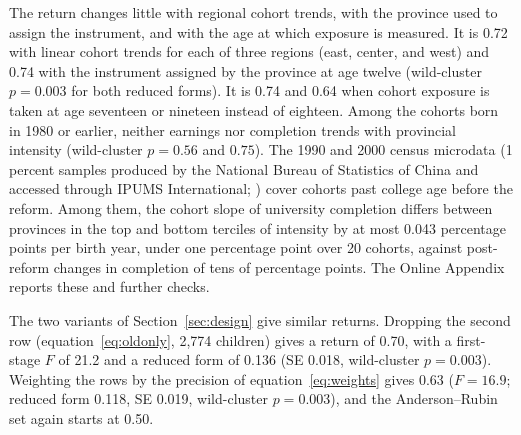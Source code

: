 \documentclass[11pt]{article}
\begin{document}
The return changes little with regional cohort trends, with the province used to assign the instrument, and with the age at which exposure is measured. It is 0.72 with linear cohort trends for each of three regions (east, center, and west) and 0.74 with the instrument assigned by the province at age twelve (wild-cluster $p = 0.003$ for both reduced forms). It is 0.74 and 0.64 when cohort exposure is taken at age seventeen or nineteen instead of eighteen. Among the cohorts born in 1980 or earlier, neither earnings nor completion trends with provincial intensity (wild-cluster $p = 0.56$ and $0.75$). The 1990 and 2000 census microdata (1 percent samples produced by the National Bureau of Statistics of China and accessed through IPUMS International; \citealp{IPUMSInternational}) cover cohorts past college age before the reform. Among them, the cohort slope of university completion differs between provinces in the top and bottom terciles of intensity by at most 0.043 percentage points per birth year, under one percentage point over 20 cohorts, against post-reform changes in completion of tens of percentage points. The Online Appendix reports these and further checks.

The two variants of Section~\ref{sec:design} give similar returns. Dropping the second row (equation~\eqref{eq:oldonly}, 2,774 children) gives a return of 0.70, with a first-stage $F$ of 21.2 and a reduced form of 0.136 (SE 0.018, wild-cluster $p = 0.003$). Weighting the rows by the precision of equation~\eqref{eq:weights} gives 0.63 ($F = 16.9$; reduced form 0.118, SE 0.019, wild-cluster $p = 0.003$), and the Anderson--Rubin set again starts at 0.50.
\end{document}

